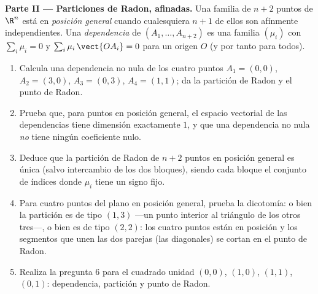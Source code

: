 \begin{problem}
\medskip
\noindent\textbf{Parte II --- Particiones de Radon, afinadas.} Una
familia de $n + 2$ puntos de $\R^n$ está en \emph{posición general}
cuando cualesquiera $n + 1$ de ellos son afínmente independientes.
Una \emph{dependencia } de $(A_1, \dots, A_{n+2})$ es una familia
$(\mu_i)$ con $\sum_i \mu_i = 0$ y $\sum_i \mu_i\,\vect{OA_i} = 0$
para un origen $O$ (y por tanto para todos).
\begin{enumerate}[resume]
  \item Calcula una dependencia  no nula de los cuatro puntos
        $A_1 = (0,0)$, $A_2 = (3,0)$, $A_3 = (0,3)$, $A_4 = (1,1)$;
        da la partición de Radon y el punto de Radon.
  \item Prueba que, para puntos en posición general, el espacio
        vectorial de las dependencias  tiene dimensión
        exactamente $1$, y que una dependencia no nula \emph{no}
        tiene ningún coeficiente nulo.
  \item Deduce que la partición de Radon de $n + 2$ puntos en
        posición general es única (salvo intercambio de los dos
        bloques), siendo cada bloque el conjunto de índices donde
        $\mu_i$ tiene un signo fijo.
  \item Para cuatro puntos del plano en posición general, prueba la
        dicotomía: o bien la partición es de tipo $(1, 3)$ ---un
        punto interior al triángulo de los otros tres---, o bien es
        de tipo $(2, 2)$: los cuatro puntos están en posición
         y los segmentos que unen las dos parejas (las
        diagonales) se cortan en el punto de Radon.
  \item Realiza la pregunta 6 para el cuadrado unidad $(0,0)$,
        $(1,0)$, $(1,1)$, $(0,1)$: dependencia, partición y punto de
        Radon.
\end{enumerate}


\end{problem}
